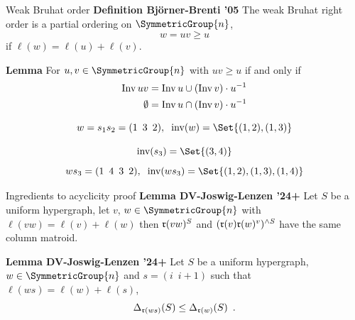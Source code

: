 \documentclass[9pt]{beamer}
\renewenvironment{definition}[1][]
{\textcolor{LineColor}{\textbf{Definition #1}} }
{}
\renewenvironment{lemma}[1][]
{\textcolor{LineColor}{\textbf{Lemma #1 }} }
{}
\begin{document}
\begin{frame}[fragile]{Weak Bruhat order}
  \begin{definition}[Bj\"orner-Brenti '05]
    The weak Bruhat right order is a partial ordering on $\SymmetricGroup{n}$,
    \[
      w = uv \geq u
    \]
    if $\ell(w) = \ell(u) + \ell(v)$.
  \end{definition}

  \pause
  \vspace{8mm}
  
  \begin{lemma}
    For $u, v \in \SymmetricGroup{n}$ with $uv \geq u$ if and only if
    \begin{align*}
      \operatorname{Inv} uv &= \operatorname{Inv} u \cup (\operatorname{Inv} v) \cdot u^{-1} \\
      \emptyset &= \operatorname{Inv} u \cap (\operatorname{Inv} v) \cdot u^{-1}
    \end{align*}
  \end{lemma}
  \pause
  \begin{example}
    \[
      w = s_1s_2 = (1 \enspace 3 \enspace 2), \hspace{2mm} \text{inv}(w) = \Set{(1, 2), (1, 3)}
    \]

    \[
      \text{inv}(s_3) = \Set{(3, 4)}
    \]
    \[
      ws_3 = (1 \enspace 4 \enspace 3 \enspace 2), \hspace{2mm} \text{inv}(ws_3) = \Set{(1, 2), (1, 3), (1, 4)}
    \]
  \end{example}
\end{frame}



\begin{frame}{Ingredients to acyclicity proof}
  \begin{lemma}[DV-Joswig-Lenzen '24+]
    Let $S$ be a uniform hypergraph, let $v$, $w \in \SymmetricGroup{n}$ with $\ell(vw) = \ell(v)+\ell(w)$ then  ${\mathfrak r}(v w)^{S}$ and
    $({\mathfrak r}(v) {\mathfrak r}(w)^v)^{\wedge S}$  have the same column matroid.
  \end{lemma}

  \vspace{8mm}
  
  \begin{lemma}[DV-Joswig-Lenzen '24+]
    Let $S$ be a uniform hypergraph, $w \in \SymmetricGroup{n}$ and $s = (i \enspace i+1)$ such that $\ell(ws) = \ell(w) + \ell(s)$,
    \[
      \Delta_{{\mathfrak r}(ws)}(S) \leq \Delta_{{\mathfrak r}(w)}(S) \enspace .
    \]
    
  \end{lemma}
\end{frame}
\end{document}
